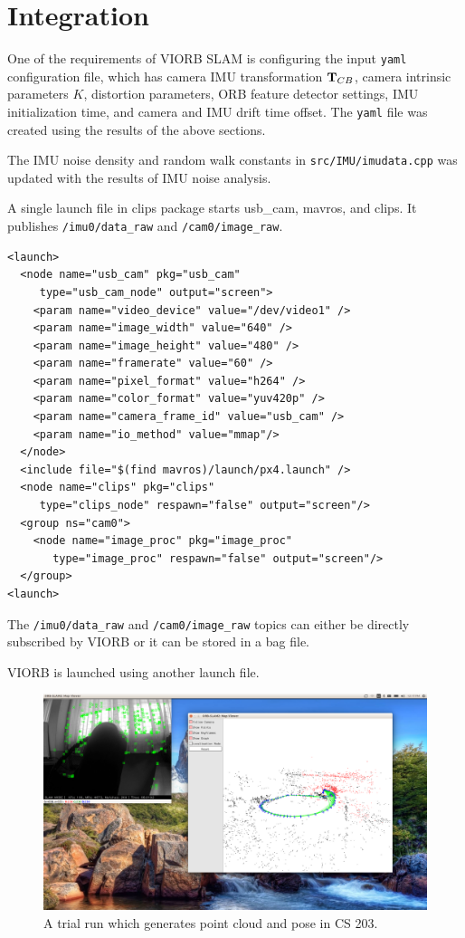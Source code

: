 \section{Integration}
One of the requirements of VIORB SLAM is configuring the input \texttt{yaml} configuration file, which has camera IMU transformation ${\bf T}_{CB}$, camera intrinsic parameters $K$, distortion parameters, ORB feature detector settings, IMU initialization time, and camera and IMU drift time offset. The \texttt{yaml} file was created using the results of the above sections.

The IMU noise density and random walk constants in \texttt{src/IMU/imudata.cpp} was updated with the results of IMU noise analysis.


A single launch file in clips package starts usb\_cam, mavros, and clips. It publishes \texttt{/imu0/data\_raw} and \texttt{/cam0/image\_raw}. 

\begin{verbatim}
<launch>
  <node name="usb_cam" pkg="usb_cam"
     type="usb_cam_node" output="screen">
    <param name="video_device" value="/dev/video1" />
    <param name="image_width" value="640" />
    <param name="image_height" value="480" />
    <param name="framerate" value="60" />
    <param name="pixel_format" value="h264" />
    <param name="color_format" value="yuv420p" />
    <param name="camera_frame_id" value="usb_cam" />
    <param name="io_method" value="mmap"/>
  </node>
  <include file="$(find mavros)/launch/px4.launch" />
  <node name="clips" pkg="clips"
     type="clips_node" respawn="false" output="screen"/>
  <group ns="cam0">
    <node name="image_proc" pkg="image_proc"
       type="image_proc" respawn="false" output="screen"/>                       
  </group>
<launch>
\end{verbatim}

The \texttt{/imu0/data\_raw} and \texttt{/cam0/image\_raw} topics can either be directly subscribed by VIORB or it can be stored in a bag file. 

VIORB is launched using another launch file.
\begin{figure}
	\centering
	\includegraphics[width=5in]{figures/cloudpoint}
	\caption[Trial run]{\small 
		 A trial run which generates point cloud and pose in CS 203. }
\end{figure}

\FloatBarrier
